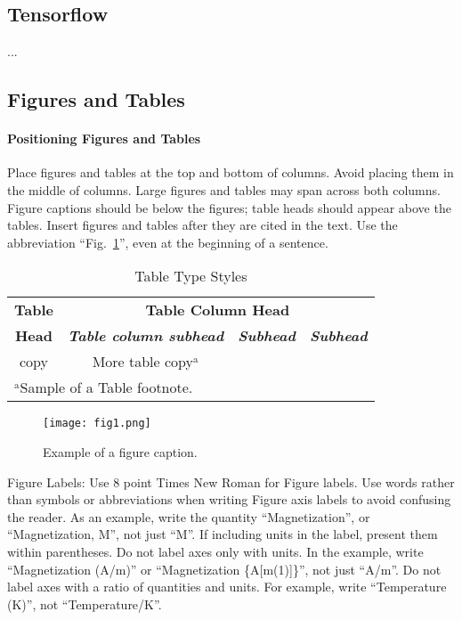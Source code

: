 \documentclass[conference]{IEEEtran}
\begin{document}
	\subsection{Tensorflow}
	...
	
	\subsection{Figures and Tables}
	\paragraph{Positioning Figures and Tables} Place figures and tables at the top and 
	bottom of columns. Avoid placing them in the middle of columns. Large 
	figures and tables may span across both columns. Figure captions should be 
	below the figures; table heads should appear above the tables. Insert 
	figures and tables after they are cited in the text. Use the abbreviation 
	``Fig.~\ref{fig}'', even at the beginning of a sentence.
	
	\begin{table}[htbp]
		\caption{Table Type Styles}
		\begin{center}
			\begin{tabular}{|c|c|c|c|}
				\hline
				\textbf{Table}&\multicolumn{3}{|c|}{\textbf{Table Column Head}} \\
				\cline{2-4} 
				\textbf{Head} & \textbf{\textit{Table column subhead}}& \textbf{\textit{Subhead}}& \textbf{\textit{Subhead}} \\
				\hline
				copy& More table copy$^{\mathrm{a}}$& &  \\
				\hline
				\multicolumn{4}{l}{$^{\mathrm{a}}$Sample of a Table footnote.}
			\end{tabular}
			\label{tab1}
		\end{center}
	\end{table}
	
	\begin{figure}[htbp]
		\centerline{\texttt{[image: fig1.png]}}
		\caption{Example of a figure caption.}
		\label{fig}
	\end{figure}
	
	Figure Labels: Use 8 point Times New Roman for Figure labels. Use words 
	rather than symbols or abbreviations when writing Figure axis labels to 
	avoid confusing the reader. As an example, write the quantity 
	``Magnetization'', or ``Magnetization, M'', not just ``M''. If including 
	units in the label, present them within parentheses. Do not label axes only 
	with units. In the example, write ``Magnetization (A/m)'' or ``Magnetization 
	\{A[m(1)]\}'', not just ``A/m''. Do not label axes with a ratio of 
	quantities and units. For example, write ``Temperature (K)'', not 
	``Temperature/K''.
	
\end{document}
